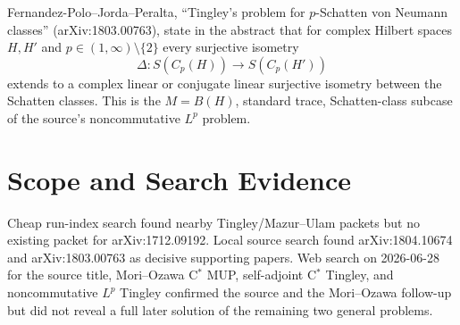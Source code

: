 \documentclass[11pt]{article}
\begin{document}
Fernandez-Polo--Jorda--Peralta, ``Tingley's problem for $p$-Schatten von
Neumann classes'' (arXiv:1803.00763), state in the abstract that for complex
Hilbert spaces $H,H'$ and $p\in(1,\infty)\setminus\{2\}$ every surjective
isometry
\[
  \Delta:S(C_p(H))\to S(C_p(H'))
\]
extends to a complex linear or conjugate linear surjective isometry between
the Schatten classes. This is the $M=B(H)$, standard trace, Schatten-class
subcase of the source's noncommutative $L^p$ problem.

\section*{Scope and Search Evidence}

Cheap run-index search found nearby Tingley/Mazur--Ulam packets but no existing
packet for arXiv:1712.09192. Local source search found arXiv:1804.10674 and
arXiv:1803.00763 as decisive supporting papers. Web search on 2026-06-28 for
the source title, Mori--Ozawa C$^*$ MUP, self-adjoint C$^*$ Tingley, and
noncommutative $L^p$ Tingley confirmed the source and the Mori--Ozawa follow-up
but did not reveal a full later solution of the remaining two general problems.
\end{document}
